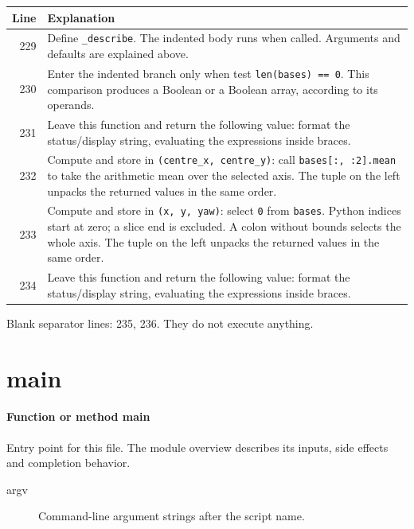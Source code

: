 \documentclass[11pt,a4paper]{book}
\begin{document}
\begin{longtable}{r p{}}

\textbf{Line} & \textbf{Explanation} \\ \hline \endhead

229 & Define \texttt{\_describe}. The indented body runs when called. Arguments and defaults are explained above. \\

230 & Enter the indented branch only when test \texttt{len(bases) == 0}. This comparison produces a Boolean or a Boolean array, according to its operands. \\

231 & Leave this function and return the following value: format the status/display string, evaluating the expressions inside braces. \\

232 & Compute and store in \texttt{(centre\_x, centre\_y)}: call \texttt{bases[:, :2].mean} to take the arithmetic mean over the selected axis. The tuple on the left unpacks the returned values in the same order. \\

233 & Compute and store in \texttt{(x, y, yaw)}: select \texttt{0} from \texttt{bases}. Python indices start at zero; a slice end is excluded. A colon without bounds selects the whole axis. The tuple on the left unpacks the returned values in the same order. \\

234 & Leave this function and return the following value: format the status/display string, evaluating the expressions inside braces. \\

\end{longtable}

Blank separator lines: 235, 236. They do not execute anything.

\section{main}

\paragraph{Function or method main}
Entry point for this file. The module overview describes its inputs, side effects and completion behavior.

\begin{description}
\item[argv] Command-line argument strings after the script name.
\end{description}
\end{document}
